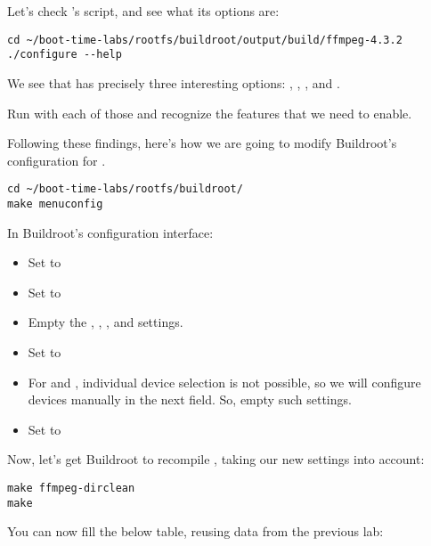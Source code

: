 Let's check 's  script, and see what its
options are:

\begin{verbatim}
cd ~/boot-time-labs/rootfs/buildroot/output/build/ffmpeg-4.3.2
./configure --help
\end{verbatim}

We see that  has precisely three interesting options:
, , ,
 and .

Run  with each of those and recognize the features that
we need to enable.

Following these findings, here's how we are going to modify Buildroot's
configuration for .

\begin{verbatim}
cd ~/boot-time-labs/rootfs/buildroot/
make menuconfig
\end{verbatim}

In Buildroot's configuration interface:

\begin{itemize}
\item Set  to 
\item Set  to 
\item Empty the , ,
      ,  and  settings.
\item Set  to 
\item For  and ,
      individual device selection is not possible, so we will configure
      devices manually in the next field. So, empty such settings.
\item Set  to\\
\end{itemize}

Now, let's get Buildroot to recompile , taking our new
settings into account:

\begin{verbatim}
make ffmpeg-dirclean
make
\end{verbatim}

You can now fill the below table, reusing data from the previous lab:

